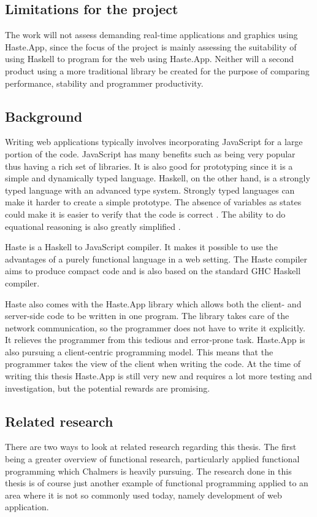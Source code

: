 \documentclass[a4paper]{article}
\begin{document}
\subsection{Limitations for the project}
The work will not assess demanding real-time applications and graphics using Haste.App, since the focus of the project is mainly assessing the suitability of using Haskell to program for the web using Haste.App. Neither will a second product using a more traditional library be created for the purpose of comparing performance, stability and programmer productivity.

\subsection{Background}
Writing web applications typically involves incorporating JavaScript for a large portion of the code. JavaScript has many benefits such as being very popular thus having a rich set of libraries. It is also good for prototyping since it is a simple and dynamically typed language. Haskell, on the other hand, is a strongly typed language with an advanced type system. Strongly typed languages can make it harder to create a simple prototype. The absence of variables as states could make it is easier to verify that the code is correct \cite{marlow2010haskell}. The ability to do equational reasoning is also greatly simplified \autocite{equational-reasoning}.

Haste is a Haskell to JavaScript compiler. It makes it possible to use the advantages of a purely functional language in a web setting. The Haste compiler aims to produce compact code and is also based on the standard GHC Haskell compiler.

Haste also comes with the Haste.App library which allows both the client- and server-side code to be written in one program\cite{ekblad2015seamless}. The library takes care of the network communication, so the programmer does not have to write it explicitly. It relieves the programmer from this tedious and error-prone task. Haste.App is also pursuing a client-centric programming model. This means that the programmer takes the view of the client when writing the code\cite{a-distributed-haskell-for-the-modern-web}. At the time of writing this thesis Haste.App is still very new and requires a lot more testing and investigation, but the potential rewards are promising.



\subsection{Related research}
There are two ways to look at related research regarding this thesis. The first being a greater overview of functional research, particularly applied functional programming which Chalmers is heavily pursuing. The research done in this thesis is of course just another example of functional programming applied to an area where it is not so commonly used today, namely development of web application.
\end{document}
